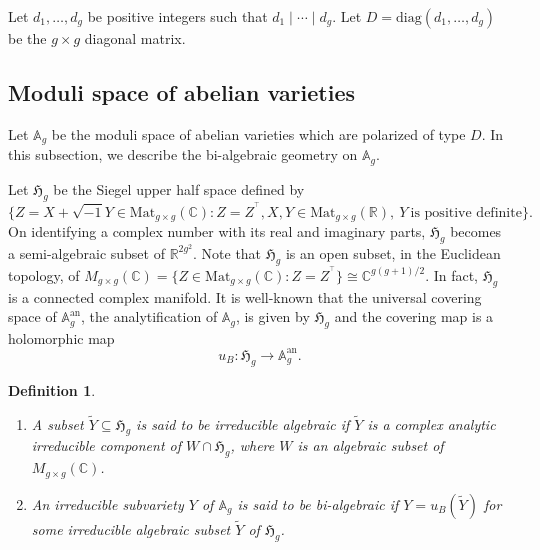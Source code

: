 \documentclass[12pt,oneside]{amsart}
\newcounter{maincounter}
\numberwithin{maincounter}{section}
\numberwithin{equation}{section}
\newtheorem{definition}[maincounter]{Definition}
\def\RR{\mathbb{R}}
\def\CC{\mathbb{C}}
\newcommand{\IC}{{\CC}}
\newcommand{\IR}{{\RR}}
\begin{document}
Let $d_1,\ldots,d_g$ be positive integers such that $d_1\mid \cdots
\mid d_g$. Let $D = \mathrm{diag}(d_1,\ldots,d_g)$ be the $g\times g$
diagonal matrix.

\subsection{Moduli space of abelian varieties} 
Let $\mathbb{A}_g$ be the moduli space of abelian varieties which are polarized of type $D$. In this subsection, we describe the bi-algebraic geometry on $\mathbb{A}_g$.

Let $\mathfrak{H}_g$ be the Siegel upper half space defined by
\[
\{ Z = X + \sqrt{-1}Y \in \mathrm{Mat}_{g \times g}(\mathbb{C}) : Z =
Z^{\!^{\intercal}},X,Y\in \mathrm{Mat}_{g\times g}(\mathbb{R}),~ Y~\text{is positive definite}\}.
\]
On identifying a complex number with its real and imaginary parts, 
 $\mathfrak{H}_g$ becomes a semi-algebraic subset of $\IR^{2g^2}$.
Note that $\mathfrak{H}_g$ is an open subset, in the Euclidean topology,  of
$M_{g\times g}(\IC) = \{Z \in \mathrm{Mat}_{g \times g}(\mathbb{C}) : Z =
Z^{\!^{\intercal}}\} \cong \IC^{g(g+1)/2}$. In fact,
$\mathfrak{H}_g$ is a connected 
complex manifold. 
It is well-known that the universal covering space of
$\mathbb{A}_g^{\mathrm{an}}$, the analytification of $\mathbb{A}_g$,
is given by $\mathfrak{H}_g$ and the covering map is a holomorphic map
\[
u_B \colon \mathfrak{H}_g \rightarrow  \mathbb{A}_g^{\mathrm{an}}.
\]


\begin{definition}%
\begin{enumerate}
\item[(i)] A subset $\tilde{Y} \subseteq \mathfrak{H}_g$ is said to be
  irreducible algebraic if $\tilde{Y}$ is a complex  analytic
  irreducible component of $W \cap \mathfrak{H}_g$, where $W$ is an
  algebraic subset of $M_{g \times g}(\mathbb{C})$.
\item[(ii)] An irreducible subvariety $Y$ of $\mathbb{A}_g$ is said to be bi-algebraic if $Y = u_B(\tilde{Y})$ for some irreducible algebraic subset $\tilde{Y}$ of $\mathfrak{H}_g$.
\end{enumerate}
\end{definition}
\end{document}
